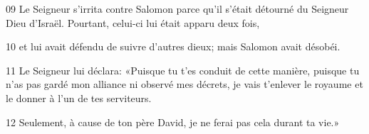 
09 Le Seigneur s’irrita contre Salomon parce qu’il s’était détourné du Seigneur Dieu d’Israël. Pourtant, celui-ci lui était apparu deux fois,

10 et lui avait défendu de suivre d’autres dieux; mais Salomon avait désobéi.

11 Le Seigneur lui déclara: «Puisque tu t’es conduit de cette manière, puisque tu n’as pas gardé mon alliance ni observé mes décrets, je vais t’enlever le royaume et le donner à l’un de tes serviteurs.

12 Seulement, à cause de ton père David, je ne ferai pas cela durant ta vie.»